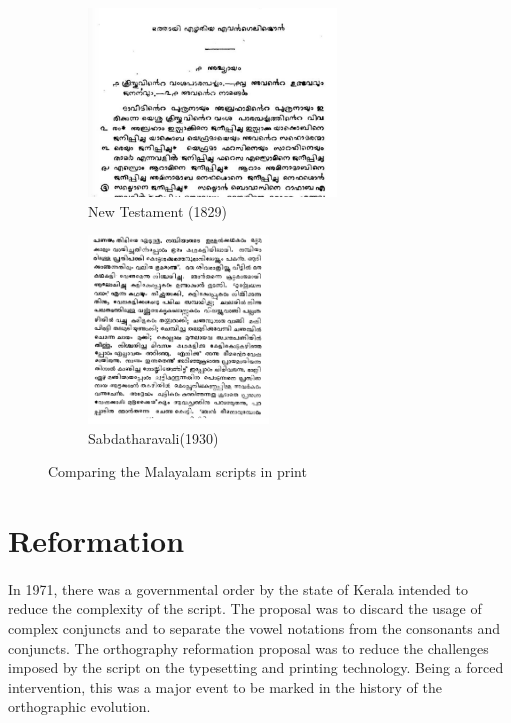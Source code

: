 \documentclass[10pt]{article}
\begin{document}
\begin{figure}[h]
\begin{subfigure}{.5\textwidth}
  \centering
  \includegraphics[width=\linewidth, height=5cm]{images/newtestament1829.png}
  \caption{New Testament (1829)}
  \label{newtestament}
\end{subfigure}%
\begin{subfigure}{.5\textwidth}
  \centering
  \includegraphics[width=\linewidth,height=5cm]{images/1930-Sabdatharavali.png}
  \caption{Sabdatharavali(1930)}
  \label{Sabdatharavali}
\end{subfigure}
\caption{Comparing the Malayalam scripts in print}
\end{figure}


\section{Reformation}

\paragraph{}
In 1971, there was a governmental order by the state of Kerala intended to reduce the complexity of the script. The proposal was to discard the usage of complex conjuncts and to separate the vowel notations from the consonants and conjuncts.  The orthography  reformation proposal was to reduce the challenges imposed by the script on the typesetting and printing technology. Being a forced intervention, this was a major event to be marked in the history of the orthographic evolution. 
\end{document}
